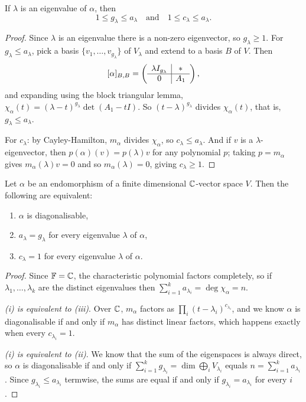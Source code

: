 \documentclass[a4paper]{scrartcl}
\begin{document}
\begin{lemma}
    If $\lambda$ is an eigenvalue of $\alpha$, then
    $$
    1 \leq g_\lambda \leq a_\lambda \quad \text{and} \quad 1 \leq c_\lambda \leq a_\lambda.
    $$
\end{lemma}
\begin{proof}
    Since $\lambda$ is an eigenvalue there is a non-zero eigenvector, so $g_\lambda \geq 1$. For $g_\lambda \leq a_\lambda$, pick a basis $\{v_1, \dots, v_{g_\lambda}\}$ of $V_\lambda$ and extend to a basis $B$ of $V$. Then
    $$
    [\alpha]_{B, B} = \left(\begin{array}{ c | c }
        \lambda I_{g_\lambda} & * \\
        \hline
        0 & A_1
      \end{array}\right),
    $$
    and expanding using the block triangular lemma, $\chi_\alpha(t) = (\lambda - t)^{g_\lambda}\det(A_1 - tI)$. So $(t - \lambda)^{g_\lambda}$ divides $\chi_\alpha(t)$, that is, $g_\lambda \leq a_\lambda$.

    For $c_\lambda$: by Cayley-Hamilton, $m_\alpha$ divides $\chi_\alpha$, so $c_\lambda \leq a_\lambda$. And if $v$ is a $\lambda$-eigenvector, then $p(\alpha)(v) = p(\lambda)v$ for any polynomial $p$; taking $p = m_\alpha$ gives $m_\alpha(\lambda) v = 0$ and so $m_\alpha(\lambda) = 0$, giving $c_\lambda \geq 1$.
\end{proof}

\begin{theorem}
    Let $\alpha$ be an endomorphism of a finite dimensional $\mathbb{C}$-vector space $V$. Then the following are equivalent:
    \begin{enumerate}[label=(\roman*)]
        \item $\alpha$ is diagonalisable,
        \item $a_\lambda = g_\lambda$ for every eigenvalue $\lambda$ of $\alpha$,
        \item $c_\lambda = 1$ for every eigenvalue $\lambda$ of $\alpha$.
    \end{enumerate}
\end{theorem}
\begin{proof}
    Since $\mathbb{F} = \mathbb{C}$, the characteristic polynomial factors completely, so if $\lambda_1, \dots, \lambda_k$ are the distinct eigenvalues then $\sum_{i = 1}^k a_{\lambda_i} = \deg \chi_\alpha = n$.

    \emph{(i) is equivalent to (iii)}. Over $\mathbb{C}$, $m_\alpha$ factors as $\prod_i (t - \lambda_i)^{c_{\lambda_i}}$, and we know $\alpha$ is diagonalisable if and only if $m_\alpha$ has distinct linear factors, which happens exactly when every $c_{\lambda_i} = 1$.

    \emph{(i) is equivalent to (ii)}. We know that the sum of the eigenspaces is always direct, so $\alpha$ is diagonalisable if and only if $\sum_{i = 1}^k g_{\lambda_i} = \dim \bigoplus_i V_{\lambda_i}$ equals $n = \sum_{i = 1}^k a_{\lambda_i}$. Since $g_{\lambda_i} \leq a_{\lambda_i}$ termwise, the sums are equal if and only if $g_{\lambda_i} = a_{\lambda_i}$ for every $i$.
\end{proof}
\end{document}

